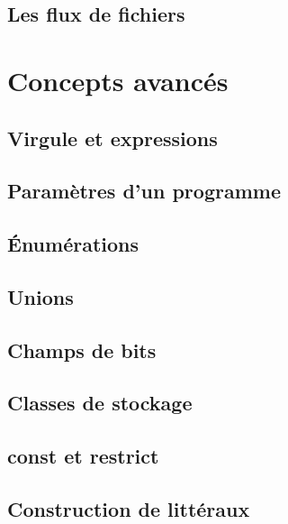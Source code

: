 \documentclass{minitelreport}
\begin{document}
\begin{refsection}
		\section{Les flux de fichiers}
			\label{sec:flux_fichiers}
			
	\chapter{Concepts avancés}
	\label{chap:concepts_avances}
		\section{Virgule et expressions}
			\label{sec:virgule_et_expressions}
			
		\section{Paramètres d'un programme}
			\label{sec:parametres_programme}
			
		\section{Énumérations}
			\label{sec:enums}
			
		\section{Unions}
			\label{sec:unions}
			
		\section{Champs de bits}
			\label{sec:champs_de_bits}
			
		\section{Classes de stockage}
			\label{sec:classes_de_stockage}
			
		\section{const et restrict}
			\label{sec:const_et_restrict}
			
		\section{Construction de littéraux}
			\label{sec:construction_de_litt_raux}
			

\end{refsection}
\end{document}
